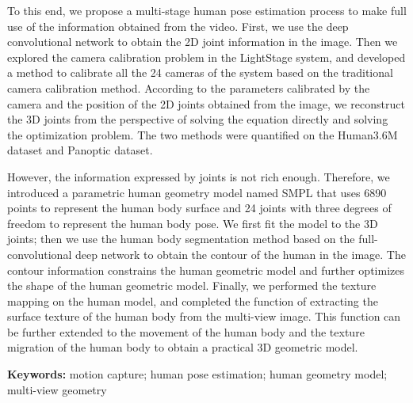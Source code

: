 To this end, we propose a multi-stage human pose estimation process to make full use of the information obtained from the video. First, we use the deep convolutional network to obtain the 2D joint information in the image. Then we explored the camera calibration problem in the LightStage system, and developed a method to calibrate all the 24 cameras of the system based on the traditional camera calibration method. According to the parameters calibrated by the camera and the position of the 2D joints obtained from the image, we reconstruct the 3D joints from the perspective of solving the equation directly and solving the optimization problem. The two methods were quantified on the Human3.6M dataset and Panoptic dataset.

However, the information expressed by joints is not rich enough. Therefore, we introduced a parametric human geometry model named SMPL that uses 6890 points to represent the human body surface and 24 joints with three degrees of freedom to represent the human body pose. We first fit the model to the 3D joints; then we use the human body segmentation method based on the full-convolutional deep network to obtain the contour of the human in the image. The contour information constrains the human geometric model and further optimizes the shape of the human geometric model. Finally, we performed the texture mapping on the human model, and completed the function of extracting the surface texture of the human body from the multi-view image. This function can be further extended to the movement of the human body and the texture migration of the human body to obtain a practical 3D geometric model.

\textbf{Keywords:} motion capture; human pose estimation; human geometry model; multi-view geometry
